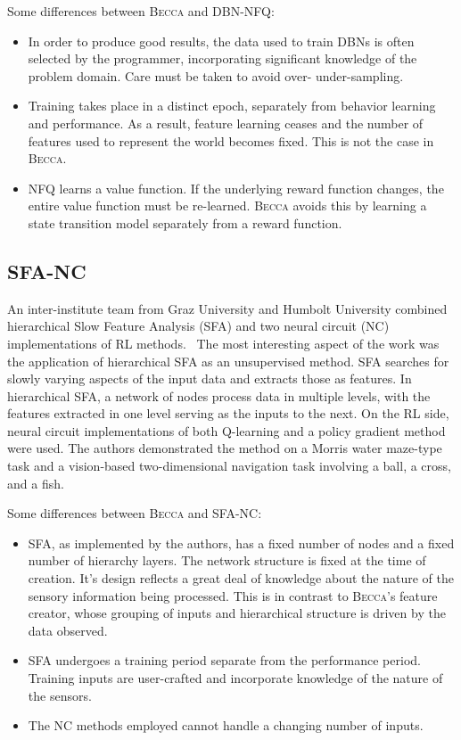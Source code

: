 Some differences between \textsc{Becca} and DBN-NFQ:

\begin{itemize}
\item In order to produce good results, the data used to train DBNs is often selected by the programmer, incorporating significant knowledge of the problem domain. Care must be taken to avoid over- under-sampling.
\item Training takes place in a distinct epoch, separately from behavior learning and performance. As a result, feature learning ceases and the number of features used to represent the world becomes fixed. This is not the case in \textsc{Becca}.
\item NFQ learns a value function. If the underlying reward function changes, the entire value function must be re-learned. \textsc{Becca} avoids this by learning a state transition model separately from a reward function.
\end{itemize}

\subsection{SFA-NC} 
An inter-institute team from Graz University and Humbolt University combined hierarchical Slow Feature Analysis (SFA) and two neural circuit (NC) implementations of RL methods.~\cite{legenstein10} The most interesting aspect of the work was the application of hierarchical SFA as an unsupervised method. SFA searches for slowly varying aspects of the input data and extracts those as features. In hierarchical SFA, a network of nodes process data in multiple levels, with the features extracted in one level serving as the inputs to the next. On the RL side, neural circuit implementations of both Q-learning and a policy gradient method were used. The authors demonstrated the method on a Morris water maze-type task and a vision-based two-dimensional navigation task involving a ball, a cross, and a fish.

Some differences between \textsc{Becca} and SFA-NC:

\begin{itemize}
\item SFA, as implemented by the authors, has a fixed number of nodes and a fixed number of hierarchy layers. The network structure is fixed at the time of creation. It's design reflects a great deal of knowledge about the nature of the sensory information being processed. This is in contrast to \textsc{Becca}'s feature creator, whose grouping of inputs and hierarchical structure is driven by the data observed.
\item SFA undergoes a training period separate from the performance period. Training inputs are user-crafted and incorporate knowledge of the nature of the sensors.
\item The NC methods employed cannot handle a changing number of inputs.
\end{itemize}

